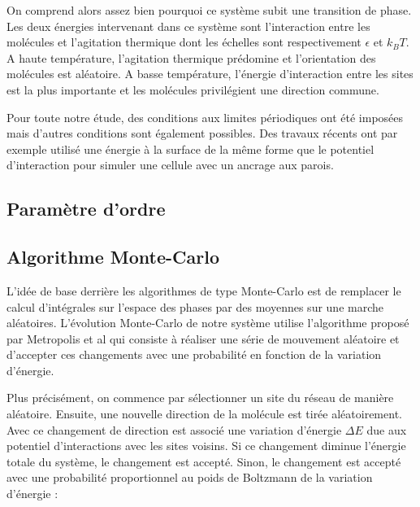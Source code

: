 \documentclass[11pt,a4paper]{article}
\numberwithin{equation}{section}
\begin{document}
On comprend alors assez bien pourquoi ce système subit une transition de phase. Les deux énergies intervenant dans ce système sont l'interaction entre les molécules et l'agitation thermique dont les échelles sont respectivement $\epsilon$ et $k_B T$.
A haute température, l'agitation thermique prédomine et l'orientation des molécules est aléatoire. A basse température, l'énergie d'interaction entre les sites est la plus importante et les molécules privilégient une direction commune.\medskip

Pour toute notre étude, des conditions aux limites périodiques ont été imposées mais d'autres conditions sont également possibles. Des travaux récents \cite{confined} ont par exemple utilisé une énergie à la surface de la même forme que le potentiel d'interaction pour simuler une cellule avec un ancrage aux parois. 


\subsection{Paramètre d'ordre}

\subsection{Algorithme Monte-Carlo}

L'idée de base derrière les algorithmes de type Monte-Carlo est de remplacer le calcul d'intégrales sur l'espace des phases par des moyennes sur une marche aléatoires. L'évolution Monte-Carlo de notre système utilise l'algorithme proposé par Metropolis et al \cite{metropolis} qui consiste à réaliser une série de mouvement aléatoire et d'accepter ces changements avec une probabilité en fonction de la variation d'énergie.\medskip

Plus précisément, on commence par sélectionner un site du réseau de manière aléatoire. Ensuite, une nouvelle direction de la molécule est tirée aléatoirement. Avec ce changement de direction est associé une variation d'énergie $\Delta E$ due aux potentiel d'interactions avec les sites voisins. Si ce changement diminue l'énergie totale du système, le changement est accepté. Sinon, le changement est accepté avec une probabilité proportionnel au poids de Boltzmann de la variation d'énergie : 
\end{document}
